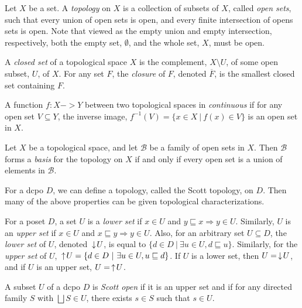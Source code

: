 \begin{definition}
Let $X$ be a set.  A \emph{topology} on $X$ is a collection of subsets of $X$, called \emph{open sets}, such that every union of open sets is open, and every finite intersection of opens sets is open.  Note that viewed as the empty union and empty intersection, respectively, both the empty set, $\emptyset$, and the whole set, $X$, must be open.
\end{definition}

\begin{definition}
A \emph{closed set} of a topological space $X$ is the complement, $X\setminus U$, of some open subset, $U$, of $X$.  For any set $F$, the \emph{closure} of $F$, denoted $\overline{F}$, is the smallest closed set containing $F$.
\end{definition}

\begin{definition}
A function $f:X->Y$ between two topological spaces in \emph{continuous} if for any open set $V\subseteq Y$, the inverse image, $f^{-1}(V) = \{x\in X\ |\ f(x) \in V\}$ is an open set in $X$.
\end{definition}

\begin{definition}
Let $X$ be a topological space, and let $\mathcal{B}$ be a family of open sets in $X$.  Then $\mathcal{B}$ forms a \emph{basis} for the topology on $X$ if and only if every open set is a union of elements in $\mathcal{B}$.
\end{definition}

For a dcpo $D$, we can define a topology, called the Scott topology, on $D$.  Then many of the above properties can be given topological characterizations.

\begin{definition}
For a poset $D$, a set $U$ is a \emph{lower set} if $x\in U$ and $y\sqsubseteq x \Rightarrow y\in U$.  Similarly, $U$ is an \emph{upper set} if $x\in U$ and $x\sqsubseteq y \Rightarrow y\in U$.  Also, for an arbitrary set $U\subseteq D$, the \emph{lower set} of $U$, denoted $\,\downarrow\! U$, is equal to $\{d\in D\ |\ \exists u\in U, d\sqsubseteq u\}$.  Similarly, for the \emph{upper set} of $U$, $\,\uparrow\! U = \{d\in D\ |\ \exists u\in U, u\sqsubseteq d\}$.  If $U$ is a lower set, then $U = \,\downarrow\! U$, and if $U$ is an upper set, $U = \,\uparrow\! U$. 
\end{definition}

\begin{definition}
A subset $U$ of a dcpo $D$ is \emph{Scott open} if it is an upper set and if for any directed family $S$ with $\bigsqcup S\in U$, there exists $s\in S$ such that $s\in U$.
\end{definition}

